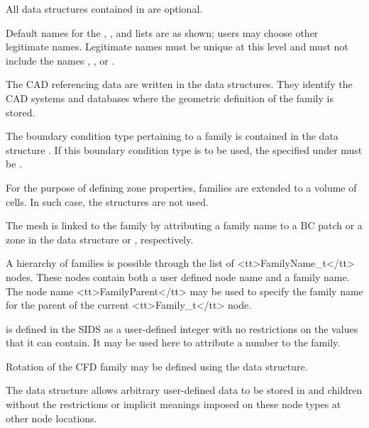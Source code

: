\begin{notes}
\item All data structures contained in  are optional.
\item Default names for the ,
      , and  lists
      are as shown; users may choose other legitimate names.
      Legitimate names must be unique at this level and must
      not include the names , , or
      .
\item The CAD referencing data are written in the
       data structures.
      They identify the CAD systems and databases where the geometric
      definition of the family is stored.
\item The boundary condition type pertaining to a family is contained in
      the data structure .
      If this boundary condition type is to be used, the 
      specified under  must be .
\item For the purpose of defining zone properties, families are extended
      to a volume of cells.
      In such case, the  structures are not
      used.
\item The mesh is linked to the family by attributing a family name
      to a BC patch or a zone in the data structure  or
      , respectively.
\item A hierarchy of families is possible through the list of <tt>FamilyName\_t</tt>
      nodes. These nodes contain both a user defined node name and a
      family name. The node name <tt>FamilyParent</tt> may be used to specify
      the family name for the parent of the current <tt>Family\_t</tt> node.
\item {} is defined in the SIDS as a user-defined integer
      with no restrictions on the values that it can contain.
      It may be used here to attribute a number to the family.
\end{notes}

Rotation of the CFD family may be defined using the
 data structure.

The  data structure allows arbitrary
user-defined data to be stored in  and
 children without the restrictions or implicit
meanings imposed on these node types at other node locations.

